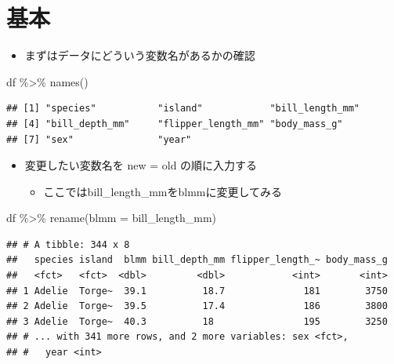 \documentclass[
  xelatex,ja=standard, b5paper]{bxjsbook}
\newenvironment{Shaded}{\begin{snugshade}}{\end{snugshade}}
\newcommand{\AttributeTok}[1]{\textcolor[rgb]{0.77,0.63,0.00}{#1}}
\newcommand{\FunctionTok}[1]{\textcolor[rgb]{0.00,0.00,0.00}{#1}}
\newcommand{\NormalTok}[1]{#1}
\newcommand{\SpecialCharTok}[1]{\textcolor[rgb]{0.00,0.00,0.00}{#1}}
\providecommand{\tightlist}{%
  \setlength{\itemsep}{0pt}\setlength{\parskip}{0pt}}
\begin{document}
\hypertarget{rename-standard}{%
\section{基本}\label{rename-standard}}

\begin{itemize}
\tightlist
\item
  まずはデータにどういう変数名があるかの確認
\end{itemize}

\begin{Shaded}
\begin{Highlighting}[]
\NormalTok{df }\SpecialCharTok{\%\textgreater{}\%} \FunctionTok{names}\NormalTok{()}
\end{Highlighting}
\end{Shaded}

\begin{verbatim}
## [1] "species"           "island"            "bill_length_mm"   
## [4] "bill_depth_mm"     "flipper_length_mm" "body_mass_g"      
## [7] "sex"               "year"
\end{verbatim}

\begin{itemize}
\tightlist
\item
  変更したい変数名を new = old の順に入力する

  \begin{itemize}
  \tightlist
  \item
    ここではbill\_length\_mmをblmmに変更してみる
  \end{itemize}
\end{itemize}

\begin{Shaded}
\begin{Highlighting}[]
\NormalTok{df }\SpecialCharTok{\%\textgreater{}\%} 
  \FunctionTok{rename}\NormalTok{(}\AttributeTok{blmm =}\NormalTok{ bill\_length\_mm)}
\end{Highlighting}
\end{Shaded}

\begin{verbatim}
## # A tibble: 344 x 8
##   species island  blmm bill_depth_mm flipper_length_~ body_mass_g
##   <fct>   <fct>  <dbl>         <dbl>            <int>       <int>
## 1 Adelie  Torge~  39.1          18.7              181        3750
## 2 Adelie  Torge~  39.5          17.4              186        3800
## 3 Adelie  Torge~  40.3          18                195        3250
## # ... with 341 more rows, and 2 more variables: sex <fct>,
## #   year <int>
\end{verbatim}
\end{document}
